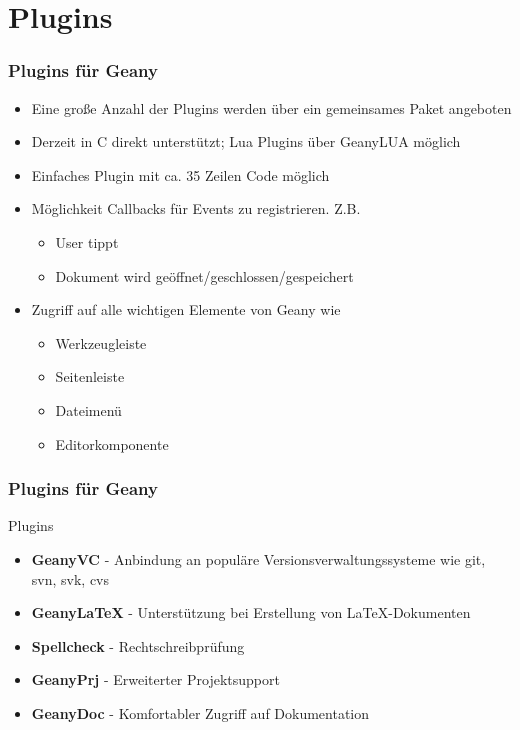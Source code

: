 \section{Plugins}
\begin{frame}
	\frametitle{Plugins für Geany}
	\begin{block}{}
		\begin{itemize}
			\item Eine große Anzahl der Plugins werden über ein 
				  gemeinsames Paket angeboten
			\item Derzeit in C direkt unterstützt; Lua Plugins über
				  GeanyLUA möglich
			\item Einfaches Plugin mit ca. 35 Zeilen Code möglich
			\item Möglichkeit Callbacks für Events zu registrieren. Z.B.
				\begin{itemize}
					\item User tippt
					\item Dokument wird geöffnet/geschlossen/gespeichert
				\end{itemize}
			\item Zugriff auf alle wichtigen Elemente von Geany wie
				\begin{itemize}
					\item Werkzeugleiste
					\item Seitenleiste
					\item Dateimenü
					\item Editorkomponente
				\end{itemize}
		\end{itemize}
	\end{block}
\end{frame}

\begin{frame}
	\frametitle{Plugins für Geany}
	\begin{block}{Plugins}
		\begin{itemize}
			\item \textbf{GeanyVC} - Anbindung an populäre
				Versions\-ver\-waltungs\-systeme wie git, svn, svk, cvs
			\item \textbf{GeanyLaTeX} - Unterstützung bei Erstellung von
				\LaTeX-Dokumenten
			\item \textbf{Spellcheck} - Rechtschreibprüfung
			\item \textbf{GeanyPrj} - Erweiterter Projektsupport
			\item \textbf{GeanyDoc} - Komfortabler Zugriff auf Dokumentation
		\end{itemize}
	\end{block}
\end{frame}

